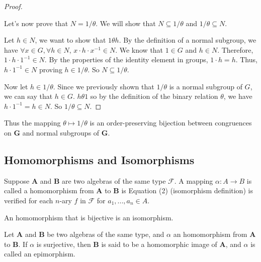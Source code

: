 \begin{example}
\begin{enumerate}
\begin{proof}
    \

    Let's now prove that $N = 1 / \theta$. We will show that
    $N \subseteq 1 / \theta$ and $1 / \theta \subseteq N$.

    Let $h \in N$, we want to show that $1 \theta h$. By the definition of a
    normal subgroup, we have $\forall x \in G, \forall h \in N$,
    $x \cdot h \cdot x^{-1} \in N$. We know that $1 \in G$ and $h \in
    N$. Therefore, $1 \cdot h \cdot 1^{-1} \in N$. By the properties of the
    identity element in groups, $1 \cdot h = h$. Thus, $h \cdot 1^{-1} \in N$
    proving $h \in 1 / \theta$. So $N \subseteq 1 / \theta$.

    Now let $h \in 1 / \theta$. Since we previously shown that $1 / \theta$ is a
    normal subgroup of $G$, we can say that $h \in G$. $h \theta 1$ so by the
    definition of the binary relation $\theta$, we have
    $h \cdot 1^{-1} = h \in N$. So $1 / \theta \subseteq N$.
  \end{proof}

  Thus the mapping $\theta \mapsto 1 / \theta$ is an order-preserving bijection between congruences on $\boldsymbol{G}$ and normal subgroups of $\boldsymbol{G}$.

  \end{enumerate}
\end{example}

\subsection{Homomorphisms and Isomorphisms}

\begin{definition}[homomorphism]
  Suppose $\boldsymbol{A}$ and $\boldsymbol{B}$ are two algebras of the same
  type $\mathcal{F}$. A mapping $\alpha: A \rightarrow B$ is called a
  homomorphism from $\boldsymbol{A}$ to $\boldsymbol{B}$ is Equation (2)
  (isomorphism definition) is verified for each $n$-ary $f$ in $\mathcal{F}$ for
  $a_1, ..., a_n \in A$.
\end{definition}

\begin{remark}
  An homomorphism that is bijective is an isomorphism.
\end{remark}

\begin{definition}
  Let $\boldsymbol{A}$ and $\boldsymbol{B}$ be two algebras of the same type,
  and $\alpha$ an homomorphism from $\boldsymbol{A}$ to $\boldsymbol{B}$. If
  $\alpha$ is surjective, then $\boldsymbol{B}$ is said to be a homomorphic
  image of $\boldsymbol{A}$, and $\alpha$ is called an epimorphism.
\end{definition}


